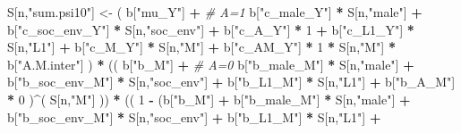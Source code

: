 \documentclass[
]{book}
\newenvironment{Shaded}{\begin{snugshade}}{\end{snugshade}}
\newcommand{\CommentTok}[1]{\textcolor[rgb]{0.56,0.35,0.01}{\textit{#1}}}
\newcommand{\DecValTok}[1]{\textcolor[rgb]{0.00,0.00,0.81}{#1}}
\newcommand{\NormalTok}[1]{#1}
\newcommand{\OtherTok}[1]{\textcolor[rgb]{0.56,0.35,0.01}{#1}}
\newcommand{\SpecialCharTok}[1]{\textcolor[rgb]{0.81,0.36,0.00}{\textbf{#1}}}
\newcommand{\StringTok}[1]{\textcolor[rgb]{0.31,0.60,0.02}{#1}}
\begin{document}
\begin{Shaded}
\begin{Highlighting}[]
\NormalTok{    S[n,}\StringTok{"sum.psi10"}\NormalTok{] }\OtherTok{\textless{}{-}}\NormalTok{  ( b[}\StringTok{"mu\_Y"}\NormalTok{] }\SpecialCharTok{+}                                          \CommentTok{\# A=1}
\NormalTok{                             b[}\StringTok{"c\_male\_Y"}\NormalTok{] }\SpecialCharTok{*}\NormalTok{ S[n,}\StringTok{"male"}\NormalTok{] }\SpecialCharTok{+} 
\NormalTok{                             b[}\StringTok{"c\_soc\_env\_Y"}\NormalTok{] }\SpecialCharTok{*}\NormalTok{ S[n,}\StringTok{"soc\_env"}\NormalTok{] }\SpecialCharTok{+} 
\NormalTok{                             b[}\StringTok{"c\_A\_Y"}\NormalTok{] }\SpecialCharTok{*} \DecValTok{1} \SpecialCharTok{+} 
\NormalTok{                             b[}\StringTok{"c\_L1\_Y"}\NormalTok{] }\SpecialCharTok{*}\NormalTok{ S[n,}\StringTok{"L1"}\NormalTok{] }\SpecialCharTok{+}
\NormalTok{                             b[}\StringTok{"c\_M\_Y"}\NormalTok{] }\SpecialCharTok{*}\NormalTok{ S[n,}\StringTok{"M"}\NormalTok{] }\SpecialCharTok{+}
\NormalTok{                             b[}\StringTok{"c\_AM\_Y"}\NormalTok{] }\SpecialCharTok{*} \DecValTok{1} \SpecialCharTok{*}\NormalTok{ S[n,}\StringTok{"M"}\NormalTok{] }\SpecialCharTok{*}\NormalTok{ b[}\StringTok{"A.M.inter"}\NormalTok{] ) }\SpecialCharTok{*}
\NormalTok{      (( b[}\StringTok{"b\_M"}\NormalTok{] }\SpecialCharTok{+}                                                             \CommentTok{\# A\textquotesingle{}=0}
\NormalTok{           b[}\StringTok{"b\_male\_M"}\NormalTok{] }\SpecialCharTok{*}\NormalTok{ S[n,}\StringTok{"male"}\NormalTok{] }\SpecialCharTok{+} 
\NormalTok{           b[}\StringTok{"b\_soc\_env\_M"}\NormalTok{] }\SpecialCharTok{*}\NormalTok{ S[n,}\StringTok{"soc\_env"}\NormalTok{] }\SpecialCharTok{+} 
\NormalTok{           b[}\StringTok{"b\_L1\_M"}\NormalTok{] }\SpecialCharTok{*}\NormalTok{ S[n,}\StringTok{"L1"}\NormalTok{] }\SpecialCharTok{+}
\NormalTok{           b[}\StringTok{"b\_A\_M"}\NormalTok{] }\SpecialCharTok{*} \DecValTok{0}\NormalTok{ )}\SpecialCharTok{\^{}}\NormalTok{( S[n,}\StringTok{"M"}\NormalTok{] )) }\SpecialCharTok{*}
\NormalTok{      (( }\DecValTok{1} \SpecialCharTok{{-}}\NormalTok{ (b[}\StringTok{"b\_M"}\NormalTok{] }\SpecialCharTok{+} 
\NormalTok{                b[}\StringTok{"b\_male\_M"}\NormalTok{] }\SpecialCharTok{*}\NormalTok{ S[n,}\StringTok{"male"}\NormalTok{] }\SpecialCharTok{+} 
\NormalTok{                b[}\StringTok{"b\_soc\_env\_M"}\NormalTok{] }\SpecialCharTok{*}\NormalTok{ S[n,}\StringTok{"soc\_env"}\NormalTok{] }\SpecialCharTok{+} 
\NormalTok{                b[}\StringTok{"b\_L1\_M"}\NormalTok{] }\SpecialCharTok{*}\NormalTok{ S[n,}\StringTok{"L1"}\NormalTok{] }\SpecialCharTok{+}

\end{Highlighting}
\end{Shaded}
\end{document}
